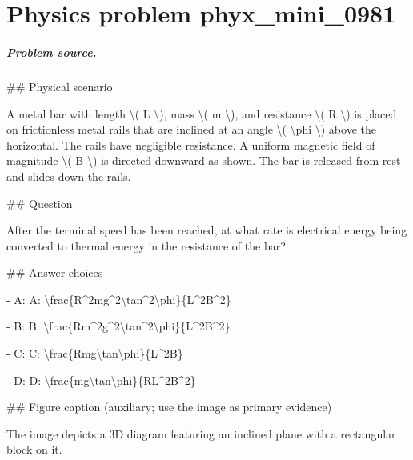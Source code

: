 
\chapter{Physics problem phyx\_mini\_0981}
\label{ch:PhyXMiniProblems_problem_phyx_mini_0981}

\paragraph{Problem source.}
\#\# Physical scenario

A metal bar with length \textbackslash{}( L \textbackslash{}), mass \textbackslash{}( m \textbackslash{}), and resistance \textbackslash{}( R \textbackslash{}) is placed on frictionless metal rails that are inclined at an angle \textbackslash{}( \textbackslash{}phi \textbackslash{}) above the horizontal. The rails have negligible resistance. A uniform magnetic field of magnitude \textbackslash{}( B \textbackslash{}) is directed downward as shown. The bar is released from rest and slides down the rails.

\#\# Question

After the terminal speed has been reached, at what rate is electrical energy being converted to thermal energy in the resistance of the bar?

\#\# Answer choices

- A: A: \textbackslash{}frac\{R\textasciicircum{}2mg\textasciicircum{}2\textbackslash{}tan\textasciicircum{}2\textbackslash{}phi\}\{L\textasciicircum{}2B\textasciicircum{}2\}

- B: B: \textbackslash{}frac\{Rm\textasciicircum{}2g\textasciicircum{}2\textbackslash{}tan\textasciicircum{}2\textbackslash{}phi\}\{L\textasciicircum{}2B\textasciicircum{}2\}

- C: C: \textbackslash{}frac\{Rmg\textbackslash{}tan\textbackslash{}phi\}\{L\textasciicircum{}2B\}

- D: D: \textbackslash{}frac\{mg\textbackslash{}tan\textbackslash{}phi\}\{RL\textasciicircum{}2B\textasciicircum{}2\}

\#\# Figure caption (auxiliary; use the image as primary evidence)

The image depicts a 3D diagram featuring an inclined plane with a rectangular block on it. 

